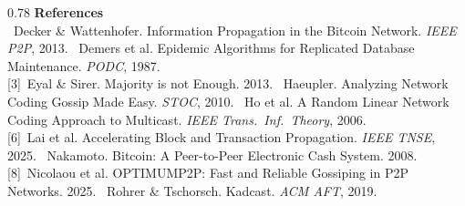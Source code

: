 \documentclass[final]{beamer}
\begin{document}
\begin{frame}[t]
\begin{tcolorbox}[
  enhanced, colback=colHeaderBg, colframe=colHeaderBg,
  arc=0pt, boxrule=0pt,
  width=0.97\paperwidth, left=18mm, right=18mm, top=10mm, bottom=10mm
  ]
  
  \begin{columns}[T]
    \begin{column}{0.78\linewidth}
      {\color{colPanelBg}\fontsize{27}{33}\bfseries\selectfont References}\\[5pt]
      {\color{white}\fontsize{23}{29}\selectfont
        [1]~Decker \& Wattenhofer. Information Propagation in the Bitcoin Network. \textit{IEEE P2P}, 2013. \quad
        [2]~Demers et al. Epidemic Algorithms for Replicated Database Maintenance. \textit{PODC}, 1987.\\[3pt]
        [3]~Eyal \& Sirer. Majority is not Enough. 2013. \quad
        [4]~Haeupler. Analyzing Network Coding Gossip Made Easy. \textit{STOC}, 2010. \quad
        [5]~Ho et al. A Random Linear Network Coding Approach to Multicast. \textit{IEEE Trans.\ Inf.\ Theory}, 2006.\\[3pt]
        [6]~Lai et al. Accelerating Block and Transaction Propagation. \textit{IEEE TNSE}, 2025. \quad
        [7]~Nakamoto. Bitcoin: A Peer-to-Peer Electronic Cash System. 2008.\\[3pt]
        [8]~Nicolaou et al. OPTIMUMP2P: Fast and Reliable Gossiping in P2P Networks. 2025. \quad
        [9]~Rohrer \& Tschorsch. Kadcast. \textit{ACM AFT}, 2019.
      }
      
    \end{column}
  \end{columns}
\end{tcolorbox}

\end{frame}
\end{document}
